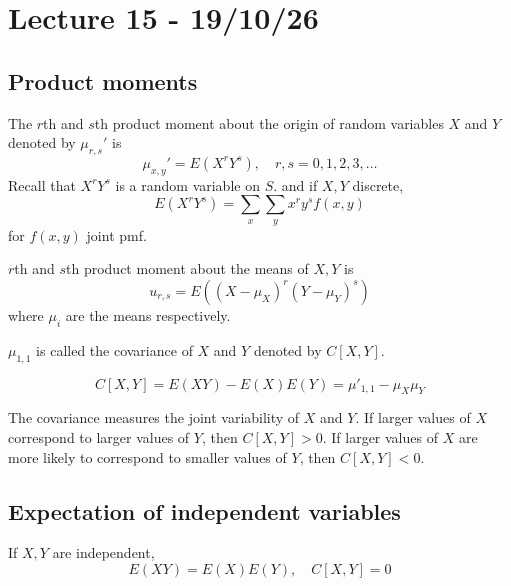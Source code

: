 \documentclass[11pt]{article}
\begin{document}
\section{Lecture 15 - 19/10/26}
\subsection{Product moments}
\begin{definition}
    The $r$th and $s$th product moment about the origin of random variables $X$ and $Y$ denoted by $\mu_{r,s}'$ is 
    \[
        \mu_{x,y}' = E(X^rY^s), \quad r, s = 0,1,2,3,\dots
    \]
    Recall that $X^rY^s$ is a random variable on $S$. and if $X, Y$ discrete,
    \[
        E(X^rY^s) = \sum_{x } \sum_{y} x^ry^sf(x,y) 
    \]
    for $f(x,y)$ joint pmf.
\end{definition}
\begin{definition}
    $r$th and $s$th product moment about the means of $X, Y$ is 
    \[
        u_{r,s} = E((X-\mu_X)^r(Y-\mu_Y)^s)
    \]
    where $\mu_i$ are the means respectively.
\end{definition}
\begin{definition}
    $\mu_{1,1}$ is called the covariance of $X$ and $Y$ denoted by $C[X,Y]$.
\end{definition}
\begin{theorem}
    \[
        C[X,Y] = E(XY) - E(X)E(Y) = \mu'_{1,1}-\mu_X\mu_Y
    \]
    
\end{theorem}
\begin{remark}
    The covariance measures the joint variability of $X$ and $Y$. If larger values of $X$ correspond to larger values of $Y$, then $C[X,Y] > 0$.
    If larger values of $X$ are more likely to correspond to smaller values of $Y$, then $C[X,Y] < 0$. 
\end{remark}
\subsection{Expectation of independent variables}
\begin{theorem}
    If $X,Y$ are independent, 
    \[
        E(XY) = E(X)E(Y), \quad C[X,Y] = 0
    \]
    
\end{theorem}
\end{document}
